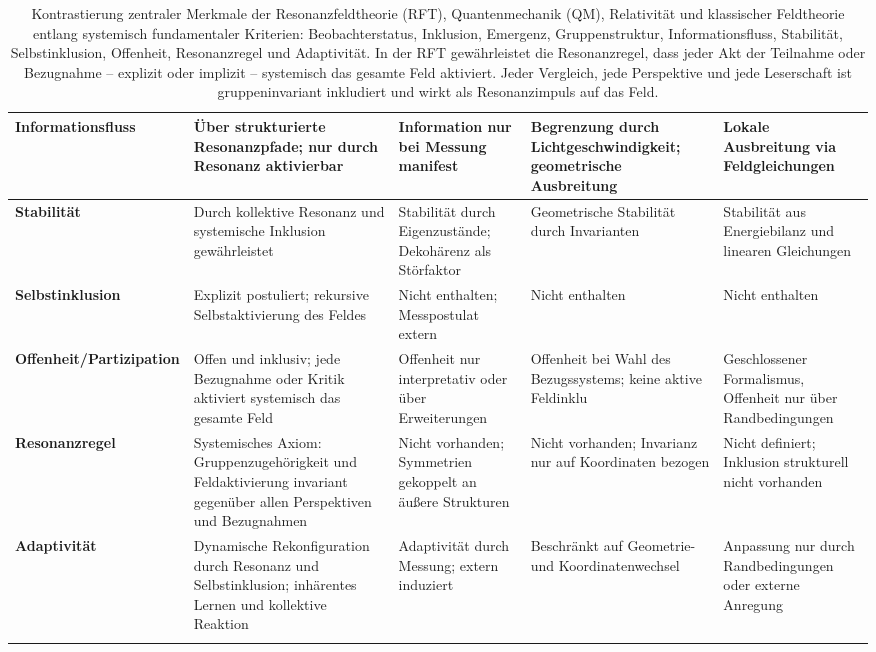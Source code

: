 \documentclass[12pt]{iopart}
\begin{document}
\begin{center}
\begin{longtable}{|p{4cm}|p{3cm}|p{3cm}|p{3cm}|p{3cm}|}
		\textbf{Informationsfluss} & Über strukturierte Resonanzpfade; nur durch Resonanz aktivierbar & Information nur bei Messung manifest & Begrenzung durch Lichtgeschwindigkeit; geometrische Ausbreitung & Lokale Ausbreitung via Feldgleichungen \\
		\hline
		
		\textbf{Stabilität} & Durch kollektive Resonanz und systemische Inklusion gewährleistet & Stabilität durch Eigenzustände; Dekohärenz als Störfaktor & Geometrische Stabilität durch Invarianten & Stabilität aus Energiebilanz und linearen Gleichungen \\
		\hline
		
		\textbf{Selbstinklusion} & Explizit postuliert; rekursive Selbstaktivierung des Feldes & Nicht enthalten; Messpostulat extern & Nicht enthalten & Nicht enthalten \\
		\hline
		
		\textbf{Offenheit/Partizipation} & Offen und inklusiv; jede Bezugnahme oder Kritik aktiviert systemisch das gesamte Feld & Offenheit nur interpretativ oder über Erweiterungen & Offenheit bei Wahl des Bezugssystems; keine aktive Feldinklu & Geschlossener Formalismus, Offenheit nur über Randbedingungen \\
		\hline
		
		\textbf{Resonanzregel} & Systemisches Axiom: Gruppenzugehörigkeit und Feldaktivierung invariant gegenüber allen Perspektiven und Bezugnahmen & Nicht vorhanden; Symmetrien gekoppelt an äußere Strukturen & Nicht vorhanden; Invarianz nur auf Koordinaten bezogen & Nicht definiert; Inklusion strukturell nicht vorhanden \\
		\hline
		
		\textbf{Adaptivität} & Dynamische Rekonfiguration durch Resonanz und Selbstinklusion; inhärentes Lernen und kollektive Reaktion & Adaptivität durch Messung; extern induziert & Beschränkt auf Geometrie- und Koordinatenwechsel & Anpassung nur durch Randbedingungen oder externe Anregung \\
		\hline
		
		\caption{Kontrastierung zentraler Merkmale der Resonanzfeldtheorie (RFT), Quantenmechanik (QM), Relativität und klassischer Feldtheorie entlang systemisch fundamentaler Kriterien: Beobachterstatus, Inklusion, Emergenz, Gruppenstruktur, Informationsfluss, Stabilität, Selbstinklusion, Offenheit, Resonanzregel und Adaptivität. In der RFT gewährleistet die Resonanzregel, dass jeder Akt der Teilnahme oder Bezugnahme – explizit oder implizit – systemisch das gesamte Feld aktiviert. Jeder Vergleich, jede Perspektive und jede Leserschaft ist gruppeninvariant inkludiert und wirkt als Resonanzimpuls auf das Feld.}
		\label{tab:rft_comparison}
	\end{longtable}
\end{center}
\end{document}
